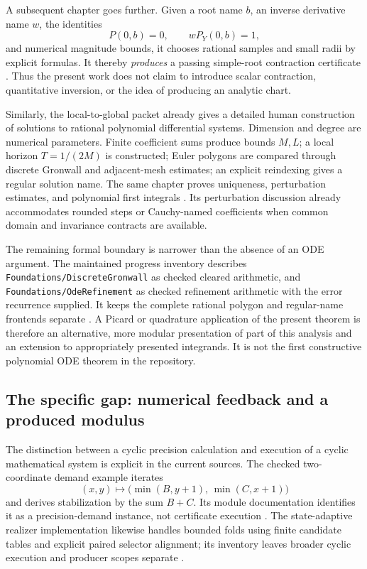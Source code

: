 A subsequent chapter goes further. Given a root name \(b\), an inverse
derivative name \(w\), the identities
\[
 P(0,b)=0,\qquad wP_Y(0,b)=1,
\]
and numerical magnitude bounds, it chooses rational samples and small
radii by explicit formulas. It thereby \emph{produces} a passing
simple-root contraction certificate \cite{audit-scalar-producer}.
Thus the present work does not claim to introduce scalar contraction,
quantitative inversion, or the idea of producing an analytic chart.

Similarly, the local-to-global packet already gives a detailed human
construction of solutions to rational polynomial differential systems.
Dimension and degree are numerical parameters. Finite coefficient sums
produce bounds \(M,L\); a local horizon \(T=1/(2M)\) is constructed;
Euler polygons are compared through discrete Gronwall and adjacent-mesh
estimates; an explicit reindexing gives a regular solution name.
The same chapter proves uniqueness, perturbation estimates, and polynomial
first integrals \cite{audit-ode}.
Its perturbation discussion already accommodates rounded steps or
Cauchy-named coefficients when common domain and invariance contracts are
available.

The remaining formal boundary is narrower than the absence of an ODE
argument. The maintained progress inventory describes
\texttt{Foundations/DiscreteGronwall} as checked cleared arithmetic, and
\texttt{Foundations/OdeRefinement} as checked refinement arithmetic with the
error recurrence supplied. It keeps the complete rational polygon and
regular-name frontends separate \cite{audit-progress}.
A Picard or quadrature application of the present theorem is therefore an
alternative, more modular presentation of part of this analysis and an
extension to appropriately presented integrands. It is not the first
constructive polynomial ODE theorem in the repository.

\subsection{The specific gap: numerical feedback and a produced modulus}

The distinction between a cyclic precision calculation and execution of a
cyclic mathematical system is explicit in the current sources.
The checked two-coordinate demand example iterates
\[
 (x,y)\longmapsto
   \bigl(\min(B,y+1),\,\min(C,x+1)\bigr)
\]
and derives stabilization by the sum \(B+C\).
Its module documentation identifies it as a precision-demand instance, not
certificate execution \cite{audit-demand}.
The state-adaptive realizer implementation likewise handles bounded folds
using finite candidate tables and explicit paired selector alignment;
its inventory leaves broader cyclic execution and producer scopes
separate \cite{audit-adaptive,audit-progress}.

